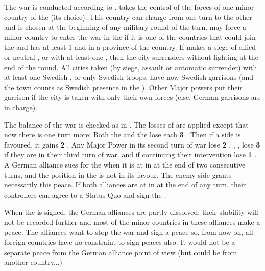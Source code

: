 \phmil
\aparag The war is conducted according to .
\aparag \SUE takes the control of the forces of one minor country of the
\alliance (its choice). This country can change from one turn to the other and
is chosen at the beginning of any military round of the turn.
\aparag \SUE may force a minor country to enter the war in the \alliance if it
is one of the countries that could join the \alliance and \SUE has at least 1
\ARMY\faceplus and  in a province of the country.
\aparag If \SUE makes a siege of allied or neutral \provinceMecklenburg,
 or  with at least one \ARMY
\faceplus, then the city surrenders without fighting at the end of the round.
\aparag All cities taken (by siege, assault or automatic surrender) with at
least one Swedish \ARMY, or only Swedish troops, have now Swedish garrisons
(and the town counts as Swedish presence in the \HRE).  Other Major powers put
their garrison if the city is taken with only their own forces (else, German
garrisons are in charge).

\phpaix
\aparag The balance of the war is checked as in .  The losses of \STAB are applied except that now there is one turn
more:
\bparag Both the \alliance and the \ligue lose each {\bf 3} \STAB.
\bparag Then if a side is favoured, it gains {\bf 2} \STAB.
\bparag Any Major Power in its second turn of war lose {\bf 2} \STAB.
\bparag \SPA, \HOL, \AUS lose {\bf 3} \STAB if they are in their third turn of
war.
\bparag \SUE and \ENG if continuing their intervention lose {\bf 1} \STAB.
\label{pIV:TYW:Suing turn 2}
\bparag A German alliance sues for the  when it
is at  in \STAB at the end of two consecutive turns, and the
position in the \HRE is not in its favour. The enemy side grants necessarily
this peace.
\bparag If both alliances are at  in \STAB at the end of any turn,
their controllers can agree to a Status Quo and sign the
.

\bparag When the  is signed, the German
alliances are partly dissolved; their stability will not be recorded further
and most of the minor countries in these alliances make a peace.  The
alliances want to stop the war and sign a peace so, from now on, all foreign
countries have no constraint to sign peaces also. It would not be a separate
peace from the German alliance point of view (but could be from another
country...)

